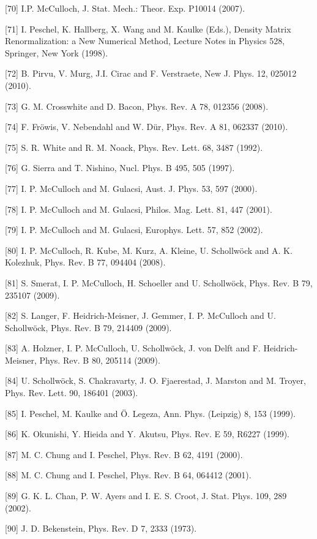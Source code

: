 \documentclass[12pt]{article}
\begin{document}
[70] I.P. McCulloch, J. Stat. Mech.: Theor. Exp. P10014 (2007).

[71] I. Peschel, K. Hallberg, X. Wang and M. Kaulke (Eds.), Density Matrix Renormalization: a New Numerical Method, Lecture Notes in Physics 528, Springer, New York (1998).

[72] B. Pirvu, V. Murg, J.I. Cirac and F. Verstraete, New J. Phys. 12, 025012 (2010).

[73] G. M. Crosswhite and D. Bacon, Phys. Rev. A 78, 012356 (2008).

[74] F. Fröwis, V. Nebendahl and W. Dür, Phys. Rev. A 81, 062337 (2010).

[75] S. R. White and R. M. Noack, Phys. Rev. Lett. 68, 3487 (1992).

[76] G. Sierra and T. Nishino, Nucl. Phys. B 495, 505 (1997).

[77] I. P. McCulloch and M. Gulacsi, Aust. J. Phys. 53, 597 (2000).

[78] I. P. McCulloch and M. Gulacsi, Philos. Mag. Lett. 81, 447 (2001).

[79] I. P. McCulloch and M. Gulacsi, Europhys. Lett. 57, 852 (2002).

[80] I. P. McCulloch, R. Kube, M. Kurz, A. Kleine, U. Schollwöck and A. K. Kolezhuk, Phys. Rev. B 77, 094404 (2008).

[81] S. Smerat, I. P. McCulloch, H. Schoeller and U. Schollwöck, Phys. Rev. B 79, 235107 (2009).

[82] S. Langer, F. Heidrich-Meisner, J. Gemmer, I. P. McCulloch and U. Schollwöck, Phys. Rev. B 79, 214409 (2009).

[83] A. Holzner, I. P. McCulloch, U. Schollwöck, J. von Delft and F. Heidrich-Meisner, Phys. Rev. B 80, 205114 (2009).

[84] U. Schollwöck, S. Chakravarty, J. O. Fjaerestad, J. Marston and M. Troyer, Phys. Rev. Lett. 90, 186401 (2003).

[85] I. Peschel, M. Kaulke and Ö. Legeza, Ann. Phys. (Leipzig) 8, 153 (1999).

[86] K. Okunishi, Y. Hieida and Y. Akutsu, Phys. Rev. E 59, R6227 (1999).

[87] M. C. Chung and I. Peschel, Phys. Rev. B 62, 4191 (2000).

[88] M. C. Chung and I. Peschel, Phys. Rev. B 64, 064412 (2001).

[89] G. K. L. Chan, P. W. Ayers and I. E. S. Croot, J. Stat. Phys. 109, 289 (2002).

[90] J. D. Bekenstein, Phys. Rev. D 7, 2333 (1973).
\end{document}
